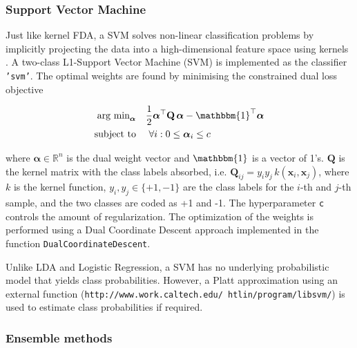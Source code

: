 \documentclass[utf8]{frontiersSCNS} %
\newcommand{\al}{\boldsymbol{\alpha}}
\newcommand{\x}{\mathbf{x}}
\newcommand{\Q}{\mathbf{Q}}
\newcommand{\R}{\mathbb{R}}
\newcommand{\ttt}[1]{\texttt{#1}}
\begin{document}
\subsubsection{Support Vector Machine}

Just like kernel FDA, a SVM solves non-linear classification problems by implicitly projecting the data into a high-dimensional feature space using kernels \citep{Bishop2007}.
A two-class L1-Support Vector Machine (SVM) is implemented as the classifier \ttt{'svm'}.
The optimal weights are found by minimising the constrained dual loss objective

\begin{align}
\begin{split}
\label{eq:svm_dual_loss_function}
\text{arg min}_{\al}\quad
& \frac{1}{2} \al^\top\Q\,\al - \mathbbm{1}^\top\al\\
\text{subject to}\quad  &\ \forall i: 0 \le \al_i \le c
\end{split}
\end{align}

where $\al\in\R^n$ is the dual weight vector and  $\mathbbm{1}$ is a vector of 1's. $\Q$ is the kernel matrix with the class labels absorbed, i.e. $\Q_{ij} = y_i y_j\, k(\x_i,\x_j)$, where $k$ is the kernel function, $y_i, y_j \in\{+1, -1\}$ are the class labels for the $i$-th and $j$-th sample, and the two classes are coded as +1 and -1. The hyperparameter  \ttt{c} controls the amount of regularization. The optimization of the weights is performed using a Dual Coordinate Descent approach  \citep{Hsieh2008ASVM} implemented in the function \ttt{DualCoordinateDescent}. 


Unlike LDA and Logistic Regression, a SVM has no underlying probabilistic model that yields class probabilities. However, a Platt approximation using an external function (\ttt{http://www.work.caltech.edu/~htlin/program/libsvm/}) is used to estimate class probabilities if required.


\subsubsection{Ensemble methods}
\end{document}
